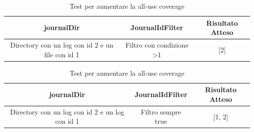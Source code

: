 \documentclass[12pt, a4paper]{article}
\begin{document}
  \begin{table}[ht]
    \centering
    \caption[Journal: Test Suite - Adequacy Data Flow 1]{Test per aumentare la all-use coverage}
    \begin{tabular}{|c|c|c|}
      \hline
      journalDir & JournalIdFilter & Risultato Atteso \\
      \hline
      {Directory con un log con id 2 e un file con id 1} & {Filtro con condizione >1} & [2] \\
      \hline
    \end{tabular}
    \label{tab:ADF1ListJournalIds}
  \end{table}

  \begin{table}[ht]
    \centering
    \caption[Journal: Test Suite - Adequacy Data Flow 1]{Test per aumentare la all-use coverage}
    \begin{tabular}{|c|c|c|}
      \hline
      journalDir & JournalIdFilter & Risultato Atteso \\
      \hline
      {Directory con un log con id 2 e un log con id 1} & {Filtro sempre true} & [1, 2] \\
      \hline
    \end{tabular}
    \label{tab:ADF1ListJournalIds}
  \end{table}
\end{document}
